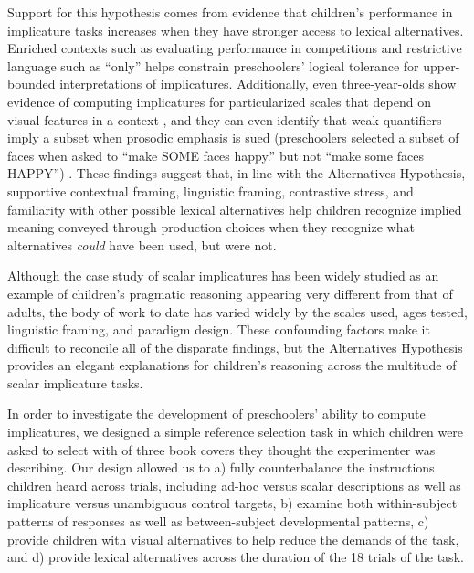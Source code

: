 \documentclass[10pt,letterpaper]{article}
\begin{document}
Support for this hypothesis comes from evidence that children's performance in implicature tasks increases when they have stronger access to lexical alternatives.  Enriched contexts such as evaluating performance in competitions \citep{papafragou2003} and restrictive language such as ``only'' helps constrain preschoolers' logical tolerance for upper-bounded interpretations \citep{barner2011} of implicatures. Additionally, even three-year-olds show evidence of computing implicatures for particularized scales that depend on visual features in a context \citep{stiller2014}, and they can even identify that weak quantifiers imply a subset when prosodic emphasis is sued (preschoolers selected a subset of faces when asked to ``make SOME faces happy.'' but not ``make some faces HAPPY'') \citep{miller2005}. These findings suggest that, in line with the Alternatives Hypothesis, supportive contextual framing, linguistic framing, contrastive stress, and familiarity with other possible lexical alternatives help children recognize implied meaning conveyed through production choices when they recognize what alternatives \emph{could} have been used, but were not. 

Although the case study of scalar implicatures has been widely studied as an example of children's pragmatic reasoning appearing very different from that of adults, the body of work to date has varied widely by the scales used, ages tested, linguistic framing, and paradigm design.  These confounding factors make it difficult to reconcile all of the disparate findings, but the Alternatives Hypothesis provides an elegant explanations for children's reasoning across the multitude of scalar implicature tasks.  

In order to investigate the development of preschoolers' ability to compute implicatures, we designed a simple reference selection task in which children were asked to select with of three book covers they thought the experimenter was describing. Our design allowed us to a) fully counterbalance the instructions children heard across trials, including ad-hoc versus scalar descriptions as well as implicature versus unambiguous control targets, b) examine both within-subject patterns of responses as well as between-subject developmental patterns, c) provide children with visual alternatives to help reduce the demands of the task, and d) provide lexical alternatives across the duration of the 18 trials of the task. 
\end{document}
